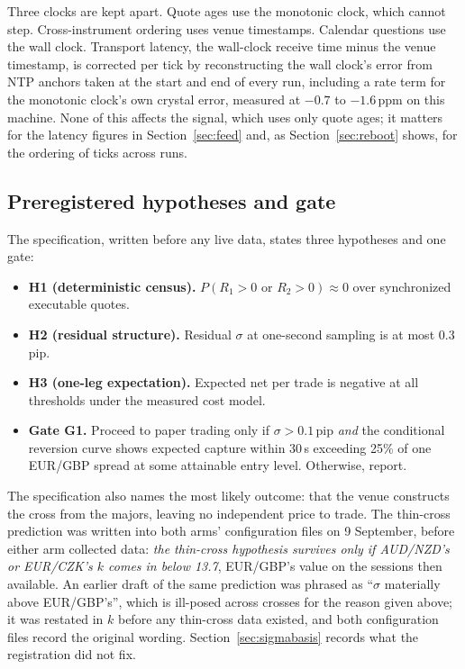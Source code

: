 \documentclass[11pt]{article}
\begin{document}
Three clocks are kept apart. Quote ages use the monotonic clock, which
cannot step. Cross-instrument ordering uses venue timestamps. Calendar
questions use the wall clock. Transport latency, the wall-clock receive
time minus the venue timestamp, is corrected per tick by reconstructing
the wall clock's error from NTP anchors taken at the start and end of
every run, including a rate term for the monotonic clock's own crystal
error, measured at $-0.7$ to $-1.6$\,ppm on this machine. None of this
affects the signal, which uses only quote ages; it matters for the
latency figures in Section~\ref{sec:feed} and, as Section~\ref{sec:reboot}
shows, for the ordering of ticks across runs.

\subsection{Preregistered hypotheses and gate}\label{sec:prereg}

The specification, written before any live data, states three
hypotheses and one gate:

\begin{itemize}\setlength{\itemsep}{2pt}
\item \textbf{H1 (deterministic census).} $P(R_1 > 0 \text{ or } R_2 > 0)
  \approx 0$ over synchronized executable quotes.
\item \textbf{H2 (residual structure).} Residual $\sigma$ at one-second
  sampling is at most 0.3\,pip.
\item \textbf{H3 (one-leg expectation).} Expected net per trade is
  negative at all thresholds under the measured cost model.
\item \textbf{Gate G1.} Proceed to paper trading only if $\sigma > 0.1$\,pip
  \emph{and} the conditional reversion curve shows expected capture
  within 30\,s exceeding 25\% of one EUR/GBP spread at some attainable
  entry level. Otherwise, report.
\end{itemize}

\noindent The specification also names the most likely outcome: that
the venue constructs the cross from the majors, leaving no independent
price to trade. The thin-cross prediction was written into both arms'
configuration files on 9 September, before either arm collected data:
\emph{the thin-cross hypothesis survives only if AUD/NZD's or EUR/CZK's
$k$ comes in below 13.7}, EUR/GBP's value on the sessions then
available. An earlier draft of the same prediction was phrased as
``$\sigma$ materially above EUR/GBP's'', which is ill-posed across
crosses for the reason given above; it was restated in $k$ before any
thin-cross data existed, and both configuration files record the
original wording. Section~\ref{sec:sigmabasis} records what the
registration did not fix.
\end{document}
